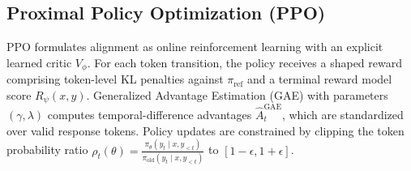 \documentclass{article}
\begin{document}
\subsection{Proximal Policy Optimization (PPO)}
PPO formulates alignment as online reinforcement learning with an explicit learned critic $V_\phi$. For each token transition, the policy receives a shaped reward comprising token-level KL penalties against $\pi_{\text{ref}}$ and a terminal reward model score $R_\psi(x, y)$. Generalized Advantage Estimation (GAE) with parameters $(\gamma, \lambda)$ computes temporal-difference advantages $\hat{A}_t^{\text{GAE}}$, which are standardized over valid response tokens. Policy updates are constrained by clipping the token probability ratio $\rho_t(\theta) = \frac{\pi_\theta(y_t \mid x, y_{<t})}{\pi_{\text{old}}(y_t \mid x, y_{<t})}$ to $[1-\epsilon, 1+\epsilon]$.
\end{document}

